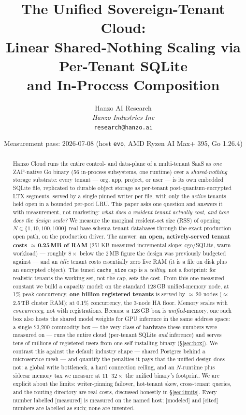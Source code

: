 \documentclass[11pt]{article}
\title{\textbf{The Unified Sovereign-Tenant Cloud:\\
Linear Shared-Nothing Scaling via Per-Tenant SQLite\\
and In-Process Composition}}
\author{Hanzo AI Research \\ \textit{Hanzo Industries Inc} \\ \texttt{research@hanzo.ai}}
\date{Measurement pass: 2026-07-08 (host \texttt{evo}, AMD Ryzen AI Max+ 395, Go 1.26.4)}
\newcommand{\meas}{\textcolor{blue!60!black}{\small[measured]}}
\newcommand{\modeled}{\textcolor{orange!70!black}{\small[modeled]}}
\newcommand{\cited}{\textcolor{purple!70!black}{\small[cited]}}
\begin{document}
\maketitle

\begin{abstract}
Hanzo Cloud runs the entire control- and data-plane of a multi-tenant SaaS as \emph{one}
ZAP-native Go binary (56 in-process subsystems, one runtime) over a \emph{shared-nothing}
storage substrate: every tenant --- org, app, project, or user --- is its own embedded SQLite
file, replicated to durable object storage as per-tenant post-quantum-encrypted LTX segments,
served by a single pinned writer per file, with only the \emph{active} tenants held open in a
bounded per-pod LRU. This paper asks one question and answers it with measurement, not
marketing: \emph{what does a resident tenant actually cost, and how does the design scale?}
We measure the marginal resident-set size (RSS) of opening $N \in \{1,10,100,1000\}$ real
base-schema tenant databases through the exact production open path, on the production driver.
The answer: \textbf{an open, actively-served tenant costs $\approx$\,0.25\,MB of RAM}
(251\,KB measured incremental slope; cgo/SQLite, warm workload) --- roughly $8\times$ below the
2\,MB figure the design was previously budgeted against --- and an \emph{idle} tenant costs
essentially zero live RAM (it is a file on disk plus an encrypted object). The tuned
\texttt{cache\_size} cap is a \emph{ceiling}, not a footprint: for realistic tenants the working
set, not the cap, sets the cost. From this one measured constant we build a capacity model: on the standard
128\,GB unified-memory node, at 1\% peak concurrency, \textbf{one billion registered tenants} is
served by $\approx$\,20 nodes ($\approx$\,2.5\,TB cluster RAM); at 0.1\% concurrency, the 3-node
HA floor. Memory scales with \emph{concurrency}, not with registrations. Because a 128\,GB box is
\emph{unified}-memory, one such box also hosts the shared model weights for GPU inference in the
same address space: a single \$3{,}200 commodity box --- the very class of hardware these numbers
were measured on --- runs the entire cloud (per-tenant SQLite \emph{and} inference) and serves
tens of millions of registered users from one self-installing binary (\S\ref{sec:box}). We contrast this against the
default industry shape --- shared Postgres behind a microservice mesh --- and quantify the
penalties it pays that the unified design does not: a global write bottleneck, a hard
connection ceiling, and an $N$-runtime plus sidecar memory tax we measure at
\textbf{$11$--$32\times$} the unified binary's footprint. We are explicit about the limits:
writer-pinning failover, hot-tenant skew, cross-tenant queries, and the routing directory are
real costs, discussed honestly in \S\ref{sec:limits}. Every number labelled \meas{} is measured
on the named host; \modeled{} and \cited{} numbers are labelled as such; none are invented.
\end{abstract}
\end{document}
